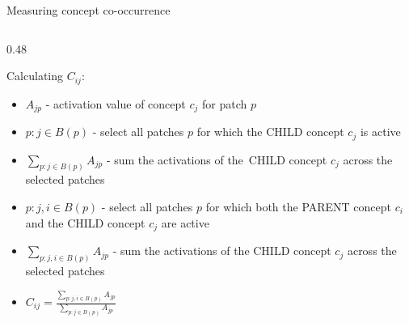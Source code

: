 \documentclass[aspectratio=169,11pt]{beamer}
\begin{document}
\begin{frame}{Measuring concept co-occurrence}
\begin{columns}[T, onlytextwidth]
        \begin{column}{0.48\textwidth}
        \begin{block}{\footnotesize Calculating $C_{ij}$:}
            \begin{itemize}[<+->]
            \footnotesize
                \item $A_{jp}$ - activation value of concept $c_j$ for patch $p$
                \item $p:j \in B(p)$ - select all patches $p$ for which the CHILD concept $c_j$ is active
                \item $\sum_{p:j \in B(p)}A_{jp}$ - sum the activations of the~CHILD concept $c_j$ across the selected patches
                \item $p:j,i \in B(p)$ - select all patches $p$ for which both the PARENT concept $c_i$ and the CHILD concept $c_j$ are active
                \item $\sum_{p:j,i \in B(p)}A_{jp}$ - sum the activations of the CHILD concept $c_j$ across the selected patches
                \item $C_{ij} = \frac{\sum_{p:j,i \in B(p)}A_{jp}}{\sum_{p:j \in B(p)}A_{jp}}$
            \end{itemize}       
        \end{block}
        \end{column}
    \end{columns} 
\end{frame}
\end{document}
